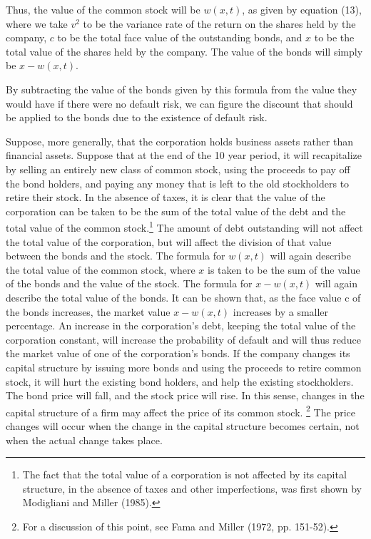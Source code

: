 \documentclass[a4paper, 12pt, twoside]{article}
\begin{document}
Thus, the value of the common stock will be $w(x,t)$, as given by equation (13), where 
we take $v^2$ to be the variance rate of the return on the shares held by the company, $c$ 
to be the total face value of the outstanding bonds, and $x$ to be the total value of 
the shares held by the company. The value of the bonds will simply be $x-w(x,t)$.

By subtracting the value of the bonds given by this formula from the value they would 
have if there were no default risk, we can figure the discount that should be applied 
to the bonds due to the existence of default risk.

Suppose, more generally, that the corporation holds business assets rather than 
financial assets. Suppose that at the end of the 10 year period, it will recapitalize 
by selling an entirely new class of common stock, using the proceeds to pay off the 
bond holders, and paying any money that is left to the old stockholders to retire 
their stock. In the absence of taxes, it is clear that the value of the corporation 
can be taken to be the sum of the total value of the debt and the total value of the 
common stock.\footnote{\linespread{1}\fontsize{10}{10}\selectfont  
The fact that the total value of a corporation is not affected by its 
capital structure, in the absence of taxes and other imperfections, was first shown by 
Modigliani and Miller (1985).
}
The amount of debt outstanding will not affect the total value of the 
corporation, but will affect the division of that value between the bonds and the 
stock. The formula for $w(x,t)$ will again describe the total value of the common stock, 
where $x$ is taken to be the sum of the value of the bonds and the value of the stock. 
The formula for $x-w(x,t)$ will again describe the total value of the bonds. It can be 
shown that, as the face value c of the bonds increases, the market value $x-w(x,t)$ 
increases by a smaller percentage. An increase in the corporation's debt, keeping the 
total value of the corporation constant, will increase the probability of default and 
will thus reduce the market value of one of the corporation's bonds. If the company 
changes its capital structure by issuing more bonds and using the proceeds to retire 
common stock, it will hurt the existing bond holders, and help the existing 
stockholders. The bond price will fall, and the stock price will rise. In this sense, 
changes in the capital structure of a firm may affect the price of its common stock.
\footnote{\linespread{1}\fontsize{10}{10}\selectfont  
For a discussion of this point, see Fama and Miller (1972, pp. 151-52).
}  
The price changes will occur when the change in the capital structure becomes certain, 
not when the actual change takes place.
\end{document}
